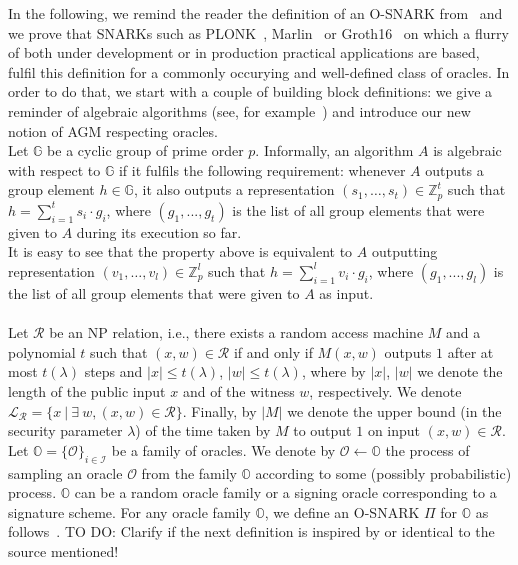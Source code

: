 In the following, we remind the reader the definition of an O-SNARK from~\cite{O_SNARK} and we prove that 
SNARKs such as PLONK~\cite{plonk}, Marlin~\cite{marlin} or Groth16~\cite{groth16} on which a flurry of 
both under development or in production practical applications are based, fulfil this definition for a commonly occurying 
and well-defined class of oracles. In order to do that, we start with a couple of building block definitions: we give a 
reminder of algebraic algorithms (see, for example~\cite{AGM_model}) and introduce our new notion of AGM respecting oracles. \\

\noindent Let $\mathbb{G}$ be a cyclic group of prime order $p$. Informally, an algorithm $A$ is algebraic with respect to 
$\mathbb{G}$ if it fulfils the following requirement: whenever $A$ outputs a group element $h \in \mathbb{G}$, 
it also outputs a representation $(s_1, \ldots, s_t) \in \mathbb{Z}^{t}_p$ 
such that $h = \sum_ {i =1}^t s_i \cdot g_i$, where $(g_1,...,g_t)$ is the list of all group elements that were given to $A$ during its execution so far. \\

\noindent It is easy to see that the property above is equivalent to $A$ outputting  representation $(v_1, \ldots, v_l) \in \mathbb{Z}^{l}_p$ 
such that $h = \sum_ {i =1}^l v_i \cdot g_i$, where $(g_1,...,g_l)$ is the list of all group elements that were given to $A$ as input. \\

\\
\noindent Let $\mathcal{R}$ be an NP relation, i.e., there exists a random access machine $M$ and a polynomial $t$ 
such that  $(x,w) \in \mathcal{R}$ if and only if $M(x,w)$ outputs $1$ after at most $t(\lambda)$ steps and 
$|x| \leq t(\lambda)$, $|w| \leq t(\lambda)$, where by $|x|$, $|w|$ we denote the length of the public input $x$ 
and of the witness $w$, respectively. We denote $\mathcal{L}_{\mathcal{R}} = \{ x\  | \ \exists \ w,  (x, w) \in \mathcal{R} \}$.  
Finally, by $|M|$ we denote the upper bound (in the security parameter $\lambda$) of the time taken by $M$ to output 
$1$ on input $(x,w) \in \mathcal{R}$.\\

\noindent Let $\mathbb{O} = \{ \mathcal{O} \}_{i \in \mathcal{I}}$ be a family of oracles. We denote by $\mathcal{O} \leftarrow \mathbb{O}$ 
the process of sampling an oracle $\mathcal{O}$ from the family $\mathbb{O}$ according to some (possibly probabilistic) process.
$\mathbb{O}$ can be a random oracle family or a signing oracle corresponding to a signature scheme. For any oracle family 
$\mathbb{O}$, we define an O-SNARK $\Pi$ for $\mathbb{O}$ as follows~\cite{O_SNARK}. {\color{red} TO DO: Clarify if the next definition is inspired by or identical to the source mentioned!} \\

